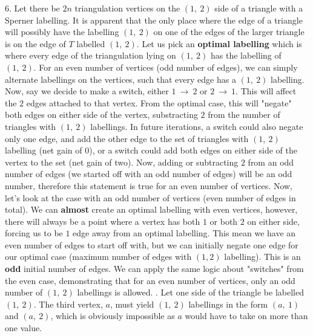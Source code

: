 \documentclass{article}
\begin{document}
6. Let there be $2n$ triangulation vertices on the $(1, \ 2)$ side of a triangle with a Sperner labelling. It is apparent that the only place where the edge of a triangle will possibly have the labelling $(1, \ 2)$ on one of the edges of the larger triangle is on the edge of $T$ labelled $(1, \ 2)$. Let us pick an \textbf{optimal labelling} which is where every edge of the triangulation lying on $(1, \ 2)$ has the labelling of $(1, \ 2)$. For an even number of vertices (odd number of edges), we can simply alternate labellings on the vertices, such that every edge has a $(1, \ 2)$ labelling. Now, say we decide to make a switch, either $1 \ \rightarrow \ 2$ or $2 \ \rightarrow \ 1$. This will affect the $2$ edges attached to that vertex. From the optimal case, this will "negate" both edges on either side of the vertex, substracting $2$ from the number of triangles with $(1, \ 2)$ labellings. In future iterations, a switch could also negate only one edge, and add the other edge to the set of triangles with $(1, \ 2)$ labelling (net gain of $0$), or a switch could add both edges on either side of the vertex to the set (net gain of two). Now, adding or subtracting $2$ from an odd number of edges (we started off with an odd number of edges) will be an odd number, therefore this statement is true for an even number of vertices. 
\newline\newline
Now, let's look at the case with an odd number of vertices (even number of edges in total). We can \textbf{almost} create an optimal labelling with even vertices, however, there will always be a point where a vertex has both $1$ or both $2$ on either side, forcing us to be $1$ edge away from an optimal labelling. This mean we have an even number of edges to start off with, but we can initially negate one edge for our optimal case (maximum number of edges with $(1, 2)$ labelling). This is an \textbf{odd} initial number of edges. We can apply the same logic about "switches" from the even case, demonstrating that for an even number of vertices, only an odd number of $(1, \ 2)$ labellings is allowed. 
\newline{}. Let one side of the triangle be labelled $(1, \ 2)$. The third vertex, $a$, must yield $(1, \ 2)$ labellings in the form $(a, \ 1)$ and $(a, \ 2)$, which is obviously impossible as $a$ would have to take on more than one value.
\newline\newline
\end{document}
